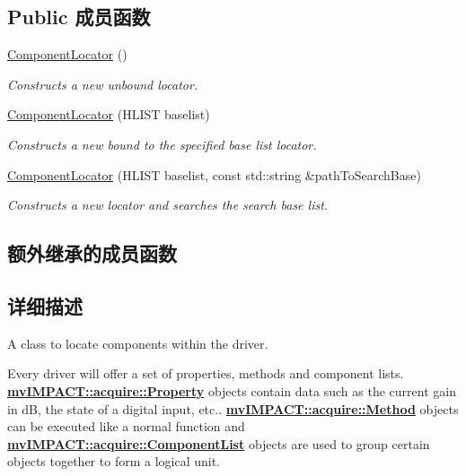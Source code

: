 \subsection*{Public 成员函数}
\begin{DoxyCompactItemize}
\item 
\hypertarget{classmv_i_m_p_a_c_t_1_1acquire_1_1_component_locator_a41b2ee2b4b479161485f134f7d82560b}{\hyperlink{classmv_i_m_p_a_c_t_1_1acquire_1_1_component_locator_a41b2ee2b4b479161485f134f7d82560b}{Component\+Locator} ()}\label{classmv_i_m_p_a_c_t_1_1acquire_1_1_component_locator_a41b2ee2b4b479161485f134f7d82560b}

\begin{DoxyCompactList}\small\item\em Constructs a new unbound locator. \end{DoxyCompactList}\item 
\hyperlink{classmv_i_m_p_a_c_t_1_1acquire_1_1_component_locator_a1093470a2b7b0adb5a4d0dfa00b8b041}{Component\+Locator} (H\+L\+I\+S\+T baselist)
\begin{DoxyCompactList}\small\item\em Constructs a new bound to the specified base list locator. \end{DoxyCompactList}\item 
\hyperlink{classmv_i_m_p_a_c_t_1_1acquire_1_1_component_locator_afd3fbd86f83d7079d80fa93513a89e04}{Component\+Locator} (H\+L\+I\+S\+T baselist, const std\+::string \&path\+To\+Search\+Base)
\begin{DoxyCompactList}\small\item\em Constructs a new locator and searches the search base list. \end{DoxyCompactList}\end{DoxyCompactItemize}
\subsection*{额外继承的成员函数}


\subsection{详细描述}
A class to locate components within the driver. 

Every driver will offer a set of properties, methods and component lists. {\bfseries \hyperlink{classmv_i_m_p_a_c_t_1_1acquire_1_1_property}{mv\+I\+M\+P\+A\+C\+T\+::acquire\+::\+Property}} objects contain data such as the current gain in d\+B, the state of a digital input, etc.. {\bfseries \hyperlink{classmv_i_m_p_a_c_t_1_1acquire_1_1_method}{mv\+I\+M\+P\+A\+C\+T\+::acquire\+::\+Method}} objects can be executed like a normal function and {\bfseries \hyperlink{classmv_i_m_p_a_c_t_1_1acquire_1_1_component_list}{mv\+I\+M\+P\+A\+C\+T\+::acquire\+::\+Component\+List}} objects are used to group certain objects together to form a logical unit.

